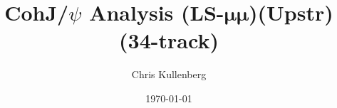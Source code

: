 \title{CohJ/$\psi$ Analysis (\textbf{LS}-$\boldsymbol{\mu\mu}$)(\textbf{Upstr})(\textbf{34-track})}
\author{Chris Kullenberg}
\date{\today}

